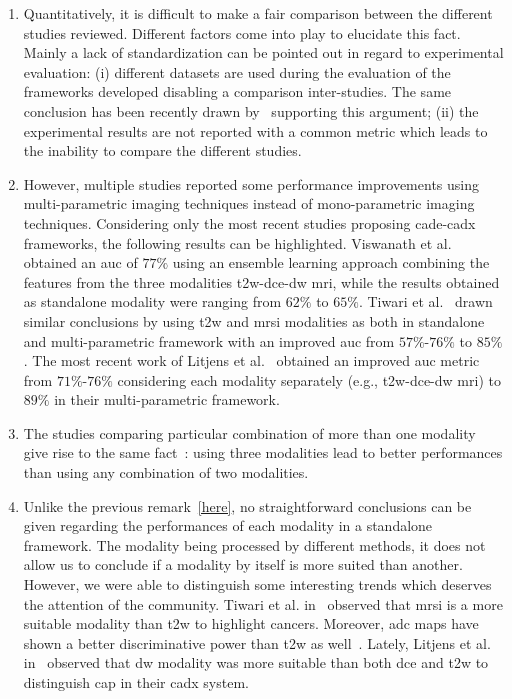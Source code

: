 \begin{enumerate}
\item Quantitatively, it is difficult to make a fair comparison between the different studies reviewed. Different factors come into play to elucidate this fact. Mainly a lack of standardization can be pointed out in regard to experimental evaluation: (i) different datasets are used during the evaluation of the frameworks developed disabling a comparison inter-studies. The same conclusion has been recently drawn by~\cite{Litjens2014} supporting this argument; (ii) the experimental results are not reported with a common metric which leads to the inability to compare the different studies.

\item \label{here} However, multiple studies reported some performance improvements using multi-parametric imaging techniques instead of mono-parametric imaging techniques. Considering only the most recent studies proposing \ac{cade}-\ac{cadx} frameworks, the following results can be highlighted. Viswanath et al.~\cite{Viswanath2011} obtained an \ac{auc} of $77\%$ using an ensemble learning approach combining the features from the three modalities \ac{t2w}-\ac{dce}-\ac{dw} \ac{mri}, while the results obtained as standalone modality were ranging from $62\%$ to $65\%$. 	
 Tiwari et al.~\cite{Tiwari2013} drawn similar conclusions by using \ac{t2w} and \ac{mrsi} modalities as both in standalone and multi-parametric framework with an improved \ac{auc} from $57\%$-$76\%$ to $85\%$. The most recent work of Litjens et al.~\cite{Litjens2014} obtained an improved \ac{auc} metric from $71\%$-$76\%$ considering each modality separately (e.g., \ac{t2w}-\ac{dce}-\ac{dw} \ac{mri}) to $89\%$ in their multi-parametric framework.

\item The studies comparing particular combination of more than one modality give rise to the same fact~\cite{Ozer2010,Litjens2011,Liu2013,Litjens2014}: using three modalities lead to better performances than using any combination of two modalities. 

\item Unlike the previous remark~\ref{here}, no straightforward conclusions can be given regarding the performances of each modality in a standalone framework. The modality being processed by different methods, it does not allow us to conclude if a modality by itself is more suited than another. However, we were able to distinguish some interesting trends which deserves the attention of the community. Tiwari et al. in~\cite{Tiwari2009a,Tiwari2012,Tiwari2013} observed that \ac{mrsi} is a more suitable modality than \ac{t2w} to highlight cancers. Moreover, \ac{adc} maps have shown a better discriminative power than \ac{t2w} as well~\cite{Langer2009,Viswanath2011,Peng2013}. Lately, Litjens et al. in~\cite{Litjens2014} observed that \ac{dw} modality was more suitable than both \ac{dce} and \ac{t2w} to distinguish \ac{cap} in their \ac{cadx} system. 


\end{enumerate}
